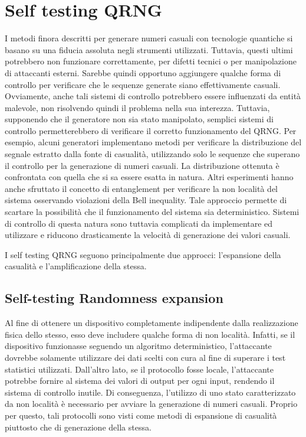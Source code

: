 \section{Self testing QRNG} \label{self_testing_qrng}
I metodi finora descritti per generare numeri casuali con tecnologie quantiche si basano su una fiducia assoluta negli strumenti utilizzati. Tuttavia, questi ultimi potrebbero non funzionare correttamente, per difetti tecnici o per manipolazione di attaccanti esterni. Sarebbe quindi opportuno aggiungere qualche forma di controllo per verificare che le sequenze generate siano effettivamente casuali. Ovviamente, anche tali sistemi di controllo potrebbero essere influenzati da entità malevole, non risolvendo quindi il problema nella sua interezza. Tuttavia, supponendo che il generatore non sia stato manipolato, semplici sistemi di controllo permetterebbero di verificare il corretto funzionamento del QRNG. Per esempio, alcuni generatori implementano metodi per verificare la distribuzione del segnale estratto dalla fonte di casualità, utilizzando solo le sequenze che superano il controllo per la generazione di numeri casuali. La distribuzione ottenuta è confrontata con quella che si sa essere esatta in natura. Altri esperimenti hanno anche sfruttato il concetto di entanglement per verificare la non località del sistema osservando violazioni della Bell inequality. Tale approccio permette di scartare la possibilità che il funzionamento del sistema sia deterministico. Sistemi di controllo di questa natura sono tuttavia complicati da implementare ed utilizzare e riducono drasticamente la velocità di generazione dei valori casuali. 

I self testing QRNG seguono principalmente due approcci: l'espansione della casualità e l'amplificazione della stessa.

\subsection{Self-testing Randomness expansion}
Al fine di ottenere un dispositivo completamente indipendente dalla realizzazione fisica dello stesso, esso deve includere qualche forma di non località. Infatti, se il dispositivo funzionasse seguendo un algoritmo deterministico, l'attaccante dovrebbe solamente utilizzare dei dati scelti con cura al fine di superare i test statistici utilizzati. Dall'altro lato, se il protocollo fosse locale, l'attaccante potrebbe fornire al sistema dei valori di output per ogni input, rendendo il sistema di controllo inutile. Di conseguenza, l'utilizzo di uno stato caratterizzato da non località è necessario per avviare la generazione di numeri casuali. Proprio per questo, tali protocolli sono visti come metodi di espansione di casualità piuttosto che di generazione della stessa.

